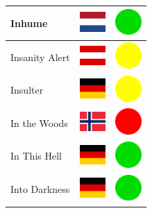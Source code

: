 \documentclass[12pt, a4paper, twoside]{report}
\begin{document}
\begin{center}
\begin{longtable}{|p{5cm}|p{2cm}|p{2cm}|}
 Inhume                                                     & \includegraphics[width=1cm]{../img/flags/nl} &   \includegraphics[width=1cm]{../likes/y} \\ \hline
 Insanity Alert                                             & \includegraphics[width=1cm]{../img/flags/at} &   \includegraphics[width=1cm]{../likes/m} \\ \hline
 Insulter                                                   & \includegraphics[width=1cm]{../img/flags/de} &   \includegraphics[width=1cm]{../likes/m} \\ \hline
 In the Woods                                               & \includegraphics[width=1cm]{../img/flags/no} &   \includegraphics[width=1cm]{../likes/n} \\ \hline
 In This Hell                                               & \includegraphics[width=1cm]{../img/flags/de} &   \includegraphics[width=1cm]{../likes/y} \\ \hline
 Into Darkness                                              & \includegraphics[width=1cm]{../img/flags/de} &   \includegraphics[width=1cm]{../likes/y} \\ \hline

\end{longtable}
\end{center}
\end{document}
